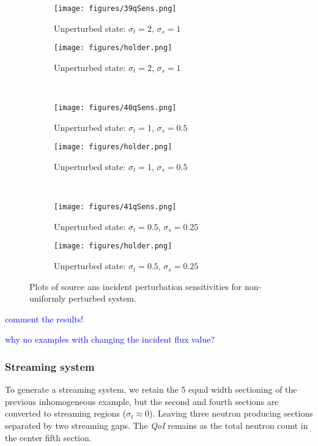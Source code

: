 \documentclass{article}
\newcommand{\sigt}{\sigma_t}
\newcommand{\sigs}{\sigma_s}
\newcommand{\qoi}{{\it QoI}\xspace}
\newcommand{\comment}[2]{\marginpar{\textcolor{#2}{$\star$}}\textcolor{#2}{#1}\newline}
\newcommand{\jcr}[1]{\comment{#1}{blue}}
\newcommand{\jcr}[1]{\phantom{a}}
\begin{document}
\begin{figure}[H]
\label{InHomoPertq}
\centering
\begin{subfigure}{.5\textwidth}
  \centering
  \texttt{[image: figures/39qSens.png]}
  \caption{Unperturbed state: $\sigt=2$, $\sigs=1$}
  \label{fig:sfig1}
\end{subfigure}%
\begin{subfigure}{.5\textwidth}
  \centering
  \texttt{[image: figures/holder.png]}
  \caption{Unperturbed state: $\sigt=2$, $\sigs=1$}
  \label{fig:sfig4}
\end{subfigure}%
\\
\begin{subfigure}{.5\textwidth}
  \centering
  \texttt{[image: figures/40qSens.png]}
  \caption{Unperturbed state: $\sigt=1$, $\sigs=0.5$}
  \label{fig:sfig2}
\end{subfigure}%
\begin{subfigure}{.5\textwidth}
  \centering
  \texttt{[image: figures/holder.png]}
  \caption{Unperturbed state: $\sigt=1$, $\sigs=0.5$}
  \label{fig:sfig5}
\end{subfigure}%
\\
\begin{subfigure}{.5\textwidth}
  \centering
  \texttt{[image: figures/41qSens.png]}
  \caption{Unperturbed state: $\sigt=0.5$, $\sigs=0.25$}
  \label{fig:sfig3}
\end{subfigure}%
\begin{subfigure}{.5\textwidth}
  \centering
  \texttt{[image: figures/holder.png]}
  \caption{Unperturbed state: $\sigt=0.5$, $\sigs=0.25$}
  \label{fig:sfig6}
\end{subfigure}%
\caption{Plots of source ans incident perturbation sensitivities for non-uniformly perturbed system.}
\label{fig:fig}
\end{figure}


\jcr{comment the results!}

\jcr{why no examples with changing the incident flux value?}

\subsubsection{Streaming system}
To generate a streaming system, we retain the 5 equal width sectioning of the previous inhomogeneous example, but the second and fourth sections are converted to streaming regions ($\sigt \approx 0 $). Leaving three neutron producing sections separated by two streaming gaps. The \qoi remains as the total neutron count in the center fifth section.
\end{document}
